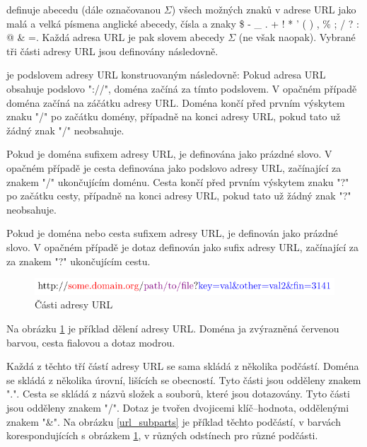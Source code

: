 \cite{berners-lee_uniform_1994} definuje abecedu (dále označovanou \( \Sigma \)) všech možných znaků v adrese URL jako malá a velká písmena anglické abecedy, čísla a znaky \$ - \_ . + ! * ' ( ) , \% ; / ? : @ \& =. Každá adresa URL je pak slovem abecedy \( \Sigma \) (ne však naopak). Vybrané tři části adresy URL jsou definovány následovně.
\begin{define}
	 je podslovem adresy URL konstruovaným následovně: Pokud adresa URL obsahuje podslovo "://", doména začíná za tímto podslovem. V opačném případě doména začíná na záčátku adresy URL. Doména končí před prvním výskytem znaku "/" po začátku domény, případně na konci adresy URL, pokud tato už žádný znak "/" neobsahuje.
\end{define}
\begin{define}
	Pokud je doména sufixem adresy URL, je  definována jako prázdné slovo. V opačném případě je cesta definována jako podslovo adresy URL, začínající za znakem "/" ukončujícím doménu. Cesta končí před prvním výskytem znaku "?" po začátku cesty, případně na konci adresy URL, pokud tato už žádný znak "?" neobsahuje.
\end{define}
\begin{define}
	Pokud je doména nebo cesta sufixem adresy URL, je  definován jako prázdné slovo. V opačném případě je dotaz definován jako sufix adresy URL, začínající za za znakem "?" ukončujícím cestu.
\end{define}

\begin{figure}[h]
	\centering
	\includegraphics{images/url_parts/url_parts.pdf}
	\caption{Části adresy URL}\label{url_parts}
\end{figure}

Na obrázku \ref{url_parts} je příklad dělení adresy URL. Doména ja zvýrazněná červenou barvou, cesta fialovou a dotaz modrou.

Každá z těchto tří částí adresy URL se sama skládá z několika podčástí. Doména se skládá z několika úrovní, lišících se obecností. Tyto části jsou odděleny znakem ".". Cesta se skládá z názvů složek a souborů, které jsou dotazovány. Tyto části jsou odděleny znakem "/". Dotaz je tvořen dvojicemi klíč--hodnota, oddělenými znakem "\&". Na obrázku \ref{url_subparts} je příklad těchto podčástí, v barvách korespondujících s obrázkem \ref{url_parts}, v různých odstínech pro různé podčásti.

